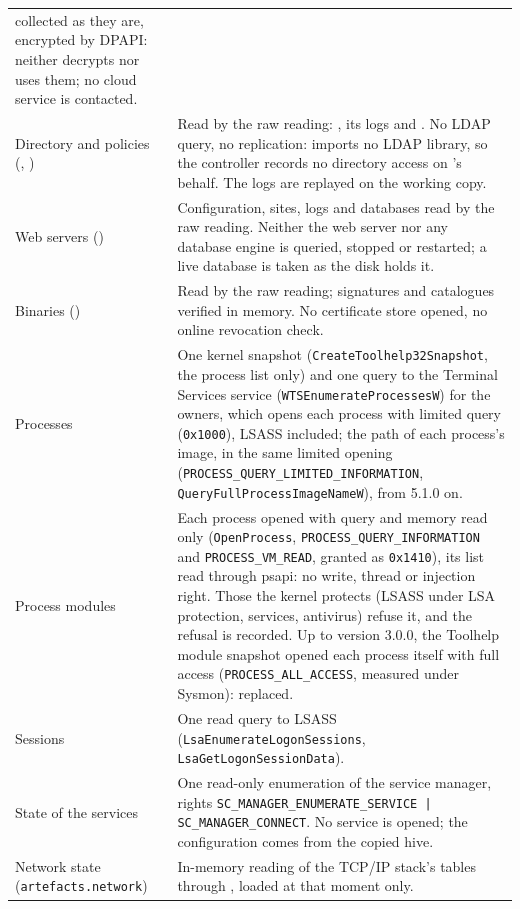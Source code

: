 \documentclass[11pt,a4paper,oneside]{report}
\begin{document}
\begin{longtable}{@{}L{4.3cm}L{10.1cm}@{}}
  collected as they are, encrypted by DPAPI: \wac{} neither decrypts nor uses
  them; no cloud service is contacted. \\
Directory and policies (, ) & Read
  by the raw reading: , its logs and . No LDAP
  query, no replication:  imports no LDAP library, so the
  controller records no directory access on \wac{}'s behalf. The logs are
  replayed on the working copy. \\
Web servers () & Configuration, sites, logs and databases read
  by the raw reading. Neither the web server nor any database engine is queried,
  stopped or restarted; a live database is taken as the disk holds it. \\
Binaries () & Read by the raw reading; signatures and catalogues
  verified in memory. No certificate store opened, no online revocation
  check. \\
Processes & One kernel snapshot (\texttt{CreateToolhelp32Snapshot}, the
  process list only) and one query to the Terminal Services service
  (\texttt{WTSEnumerateProcessesW}) for the owners, which opens each process
  with limited query (\texttt{0x1000}), LSASS included; the path of each
  process's image, in the same limited opening
  (\texttt{PROCESS\_QUERY\_LIMITED\_INFORMATION},
  \texttt{QueryFullProcessImageNameW}), from 5.1.0 on. \\
Process modules & Each process opened with query and memory read only
  (\texttt{OpenProcess}, \texttt{PROCESS\_QUERY\_INFORMATION} and
  \texttt{PROCESS\_VM\_READ}, granted as \texttt{0x1410}), its list read
  through psapi: no write, thread or injection right. Those the kernel protects
  (LSASS under LSA protection, services, antivirus) refuse it, and the refusal
  is recorded. Up to version 3.0.0, the Toolhelp module snapshot opened each
  process itself with full access (\texttt{PROCESS\_ALL\_ACCESS}, measured
  under Sysmon): replaced. \\
Sessions & One read query to LSASS (\texttt{LsaEnumerateLogonSessions},
  \texttt{LsaGetLogonSessionData}). \\
State of the services & One read-only enumeration of the service manager,
  rights \texttt{SC\_MANAGER\_ENUMERATE\_SERVICE | SC\_MANAGER\_CONNECT}. No
  service is opened; the configuration comes from the copied hive. \\
Network state (\texttt{artefacts.network}) & In-memory reading of the TCP/IP
  stack's tables through , loaded at that moment only.

\end{longtable}
\end{document}
